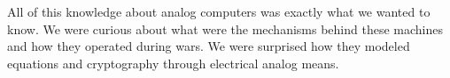 \documentclass[../computer-history.tex]{subfiles}
\begin{document}
All of this knowledge about analog computers was exactly what we wanted to know. We were curious about what were the mechanisms
behind these machines and how they operated during wars. We were surprised how they modeled equations and cryptography through electrical
analog means. 

\biblio
\end{document}
